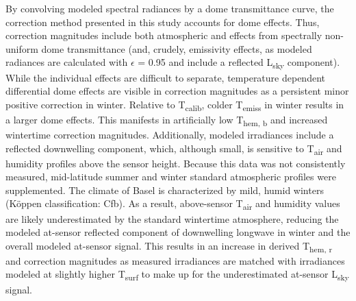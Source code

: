 \begin{bibunit}
By convolving modeled spectral radiances by a dome transmittance curve, the correction method presented in this study accounts for dome effects. Thus, correction magnitudes include both atmospheric and effects from spectrally non-uniform dome transmittance (and, crudely, emissivity effects, as modeled radiances are calculated with $\epsilon$ = 0.95 and include a reflected L\textsubscript{sky} component). While the individual effects are difficult to separate, temperature dependent differential dome effects are visible in correction magnitudes as a persistent minor positive correction in winter. Relative to T\textsubscript{calib}, colder T\textsubscript{emiss} in winter results in a larger dome effects. This manifests in artificially low T\textsubscript{hem, b} and increased wintertime correction magnitudes. Additionally, modeled irradiances include a reflected downwelling component, which, although small, is sensitive to T\textsubscript{air} and humidity profiles above the sensor height. Because this data was not consistently measured, mid-latitude summer and winter standard atmospheric profiles were supplemented. The climate of Basel is characterized by mild, humid winters (K\"oppen classification: Cfb). As a result, above-sensor T\textsubscript{air} and humidity values are likely underestimated by the standard wintertime atmosphere, reducing the modeled at-sensor reflected component of downwelling longwave in winter and the overall modeled at-sensor signal. This results in an increase in derived T\textsubscript{hem, r} and correction magnitudes as measured irradiances are matched with irradiances modeled at slightly higher T\textsubscript{surf} to make up for the underestimated at-sensor L\textsubscript{sky} signal. 


\end{bibunit}
